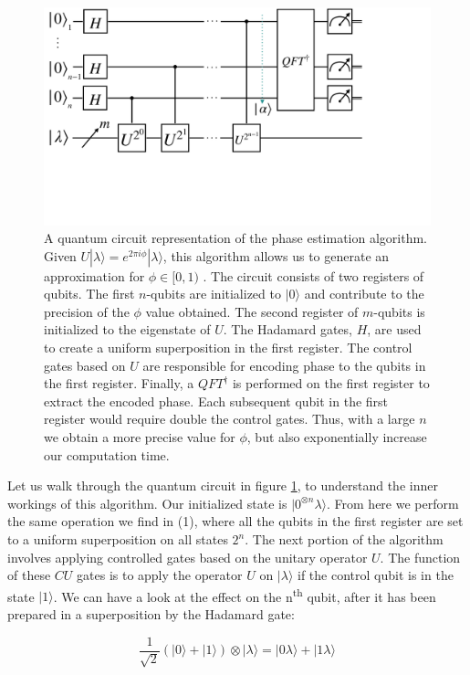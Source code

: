 \documentclass[msc,oneside]{ubcthesis}
\begin{document}
	
	\begin{figure}[!h]
		\centering
		\includegraphics[trim={1cm 12cm 11cm 0},clip, width=0.8 \linewidth]{"graphics/phase_circ"}
		\caption{A quantum circuit representation of the phase estimation algorithm. Given $ U |\lambda \rangle = e^{2\pi i \phi} |\lambda \rangle $, this algorithm allows us to generate an  approximation for $\phi \in [0,1)$ . The circuit consists of two registers of qubits. The first $n$-qubits are initialized to $|0\rangle$ and contribute to the precision of the $\phi$ value obtained. The second register of $m$-qubits is initialized to the eigenstate of $U$.  The Hadamard gates, $H$, are used to create a uniform superposition in the first register. The control gates based on $U$ are responsible for encoding phase to the qubits in the first register. Finally, a $QFT^\dagger$ is performed on the first register to extract the encoded phase. Each subsequent qubit in the first register would require double the control gates. Thus, with a large $n$ we obtain a more precise value for $\phi$, but also exponentially increase our computation time.}
		\label{fig:phasrcircuit}
	\end{figure}
	
	
	Let us walk through the quantum circuit in figure \ref{fig:phasrcircuit}, to understand the inner workings of this algorithm.	 Our initialized state is $|0^{\otimes n} \lambda\rangle$. From here we perform the same operation we find in (1), where all the qubits in the first register are set to a uniform superposition on all states $2^n$. The next portion of the algorithm involves applying controlled gates based on the unitary operator $U$. The function of these $CU$ gates is to apply the operator $U$ on $|\lambda\rangle$ if the control qubit is in the state $|1\rangle$. We can have a look at the effect on the n\textsuperscript{th} qubit, after it has been prepared in a superposition by the Hadamard gate:
	
	$$ \frac{1}{\sqrt{2}}(|0\rangle + |1\rangle) \otimes |\lambda\rangle = |0 \lambda \rangle + |1 \lambda\rangle$$
	
\end{document}
